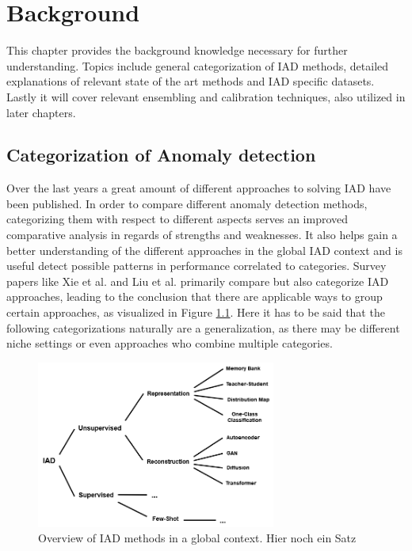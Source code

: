 \chapter{Background}
\label{chap:background}

This chapter provides the background knowledge necessary for further understanding. Topics include general categorization of IAD methods, detailed explanations of relevant 
state of the art methods and IAD specific datasets. Lastly it will cover relevant ensembling and calibration techniques, also utilized in later chapters.

\section{Categorization of Anomaly detection}
\label{sec:IADcategs}
Over the last years a great amount of different approaches to solving IAD have been published. In order to compare different anomaly detection methods, categorizing them with respect to different 
aspects serves an improved comparative analysis in regards of strengths and weaknesses. It also helps gain a better understanding of the different approaches in the global IAD context and
is useful detect possible patterns in performance correlated to categories. Survey papers like Xie et al. \cite{Xie_2024benchmarking} and 
Liu et al.
\cite{liu2024deep} primarily compare but also categorize IAD approaches, leading to the conclusion that there are applicable ways to group certain approaches, as 
visualized in Figure \ref{fig:IADcategstree}. Here it has to be said that the following categorizations naturally are a generalization, as there may be different niche settings or even approaches who combine multiple categories.

\begin{figure}[ht]
    \centering
    \includegraphics[width=0.7\textwidth]{figures/baumtree.drawio.png}
    \caption{Overview of IAD methods in a global context. Hier noch ein Satz}
    \label{fig:IADcategstree}
\end{figure}

